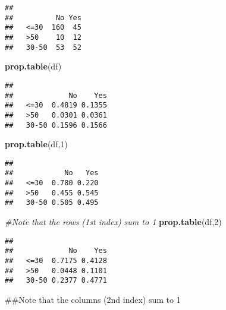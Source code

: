 \documentclass[]{book}
\newenvironment{Shaded}{\begin{snugshade}}{\end{snugshade}}
\newcommand{\KeywordTok}[1]{\textcolor[rgb]{0.13,0.29,0.53}{\textbf{#1}}}
\newcommand{\DecValTok}[1]{\textcolor[rgb]{0.00,0.00,0.81}{#1}}
\newcommand{\CommentTok}[1]{\textcolor[rgb]{0.56,0.35,0.01}{\textit{#1}}}
\newcommand{\OperatorTok}[1]{\textcolor[rgb]{0.81,0.36,0.00}{\textbf{#1}}}
\newcommand{\NormalTok}[1]{#1}
\theoremstyle{definition}
\theoremstyle{definition}
\theoremstyle{definition}
\theoremstyle{remark}
\begin{document}
\begin{Shaded}
\end{Shaded}

\begin{verbatim}
##        
##          No Yes
##   <=30  160  45
##   >50    10  12
##   30-50  53  52
\end{verbatim}

\begin{Shaded}
\begin{Highlighting}[]
\KeywordTok{prop.table}\NormalTok{(df)}
\end{Highlighting}
\end{Shaded}

\begin{verbatim}
##        
##             No    Yes
##   <=30  0.4819 0.1355
##   >50   0.0301 0.0361
##   30-50 0.1596 0.1566
\end{verbatim}

\begin{Shaded}
\begin{Highlighting}[]
\KeywordTok{prop.table}\NormalTok{(df,}\DecValTok{1}\NormalTok{)}
\end{Highlighting}
\end{Shaded}

\begin{verbatim}
##        
##            No   Yes
##   <=30  0.780 0.220
##   >50   0.455 0.545
##   30-50 0.505 0.495
\end{verbatim}

\begin{Shaded}
\begin{Highlighting}[]
\CommentTok{#Note that the rows (1st index) sum to 1}
\KeywordTok{prop.table}\NormalTok{(df,}\DecValTok{2}\NormalTok{)}
\end{Highlighting}
\end{Shaded}

\begin{verbatim}
##        
##             No    Yes
##   <=30  0.7175 0.4128
##   >50   0.0448 0.1101
##   30-50 0.2377 0.4771
\end{verbatim}

\begin{Shaded}
\begin{Highlighting}[]
\NormalTok{##Note that the columns (2nd index) sum to 1}
\end{Highlighting}
\end{Shaded}
\end{document}
